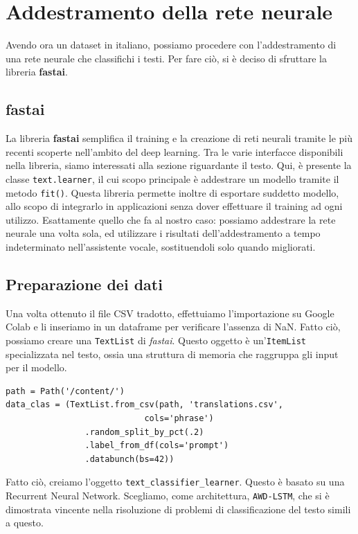 \section{Addestramento della rete neurale}
Avendo ora un dataset in italiano, possiamo procedere con l'addestramento di una rete neurale che classifichi i testi. Per fare ciò, si è deciso di sfruttare la libreria \textbf{fastai}.
\subsection{fastai}
La libreria \textbf{fastai} semplifica il training e la creazione di reti neurali tramite le più recenti scoperte nell'ambito del deep learning. Tra le varie interfacce disponibili nella libreria, siamo interessati alla sezione riguardante il testo. Qui, è presente la classe \texttt{text.learner}, il cui scopo principale è addestrare un modello tramite il metodo \texttt{fit()}. Questa libreria permette inoltre di esportare suddetto modello, allo scopo di integrarlo in applicazioni senza dover effettuare il training ad ogni utilizzo. Esattamente quello che fa al nostro caso: possiamo addestrare la rete neurale una volta sola, ed utilizzare i risultati dell'addestramento a tempo indeterminato nell'assistente vocale, sostituendoli solo quando migliorati.
\subsection{Preparazione dei dati}
Una volta ottenuto il file CSV tradotto, effettuiamo l'importazione su Google Colab e li inseriamo in un dataframe per verificare l'assenza di NaN. Fatto ciò, possiamo creare una \texttt{TextList} di \textit{fastai}. Questo oggetto è un'\texttt{ItemList} specializzata nel testo, ossia una struttura di memoria che raggruppa gli input per il modello.
\begin{verbatim}
path = Path('/content/')
data_clas = (TextList.from_csv(path, 'translations.csv', 
                            cols='phrase')
                .random_split_by_pct(.2)
                .label_from_df(cols='prompt')
                .databunch(bs=42))
\end{verbatim}
Fatto ciò, creiamo l'oggetto \texttt{text\_classifier\_learner}. Questo è basato su una Recurrent Neural Network. Scegliamo, come architettura, \texttt{AWD-LSTM}, che si è dimostrata vincente nella risoluzione di problemi di classificazione del testo simili a questo.
